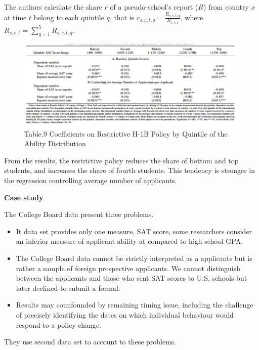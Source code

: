 \documentclass[../root]{subfiles}
\begin{document}
    
    The authors calculate the share $r$ of a pseudo-school's report ($R$) from country $x$ at time $t$ belong to each quintile $q$, that is $r_{s,c,t,q} = \frac{R_{s,c,t,q}}{R_{s,c,t}}$, where $R_{s,c,t} = \sum^5_{q=1} R_{s,c,t,q}$.
    
    \begin{figure}
        \centering
        \includegraphics[width = \linewidth]{1016sugiyama/Table_9.png}
        \caption{Table.9 Coefficients on Restrictive H-1B Policy by Quintile of the Ability Distribution}
        \label{fig:my_label}
    \end{figure}
    
    From the results, the restrictive policy reduces the share of bottom and top students, and increases the share of fourth students. This tendency is stronger in the regression controlling average number of applicants. 
    
    {\bf Case study}
    
    The College Board data present three problems.
    \begin{itemize}
        \item It data set provides only one measure, SAT score, some researchers consider an inferior measure of applicant ability at compared to high school GPA.
        \item The College Board data cannot be strictly interpreted as a applicants but is rather a sample of foreign prospective applicants. We cannot distinguish between the applicants and those who sent SAT scores to U.S. schools but later declined to submit a formal.  
        \item Results may counfounded by remaining timing issue, including the challenge of precisely identifying the dates on which individual behaviour would respond to a policy change.
    \end{itemize}
    
    They use second data set to account to these problems.
    
\end{document}
